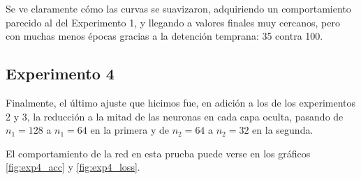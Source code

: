 \documentclass[aps,twocolumn,groupedaddress]{revtex4-2}
\begin{document}
Se ve claramente cómo las curvas se suavizaron, adquiriendo un comportamiento parecido al del Experimento 1, y llegando a valores finales muy cercanos, pero con muchas menos épocas gracias a la detención temprana: 35 contra 100.

\subsection{Experimento 4}
Finalmente, el último ajuste que hicimos fue, en adición a los de los experimentos 2 y 3, la reducción a la mitad de las neuronas en cada capa oculta, pasando de \(n_1=128\) a \(n_1=64\) en la primera y de \(n_2=64\) a \(n_2=32\) en la segunda.

El comportamiento de la red en esta prueba puede verse en los gráficos \ref{fig:exp4_acc} y \ref{fig:exp4_loss}.
\end{document}
